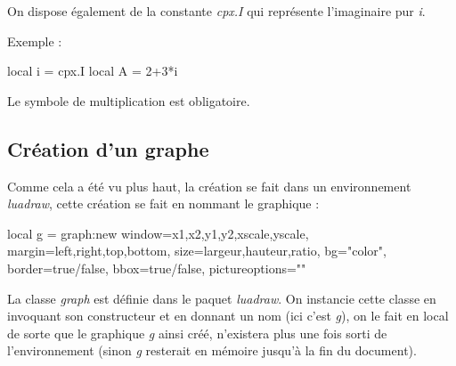 On dispose également de la constante \emph{cpx.I} qui représente l'imaginaire pur \emph{i}. 

Exemple :

\begin{Luacode}
local i = cpx.I
local A = 2+3*i
\end{Luacode}

Le symbole de multiplication est obligatoire.

\subsection{Création d'un graphe}

Comme cela a été vu plus haut, la création se fait dans un environnement \emph{luadraw}, cette création se fait en nommant le graphique :

\begin{Luacode}
local g = graph:new{ window={x1,x2,y1,y2,xscale,yscale}, margin={left,right,top,bottom}, 
                     size={largeur,hauteur,ratio}, bg="color", border=true/false, bbox=true/false, pictureoptions="" }
\end{Luacode}

La classe \emph{graph} est définie dans le paquet \emph{luadraw}. On instancie cette classe en invoquant son constructeur et en donnant un nom (ici c'est \emph{g}), on le fait en local de sorte que le graphique \emph{g} ainsi créé, n'existera plus une fois sorti de l'environnement (sinon \emph{g} resterait en mémoire jusqu'à la fin du document).

